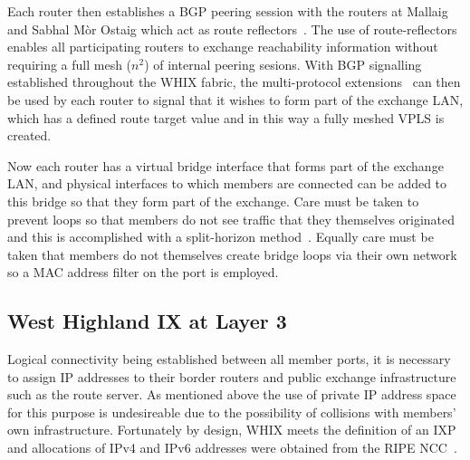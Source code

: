 Each router then establishes a \ac{BGP} peering session with the
routers at Mallaig and Sabhal M\`{o}r Ostaig which act as route
reflectors~\cite{rfc4456}. The use of route-reflectors enables all
participating routers to exchange reachability information without
requiring a full mesh ($n^2$) of internal peering
sesions. With \ac{BGP} signalling established throughout the \ac{WHIX}
fabric,  the multi-protocol extensions~\cite{rfc4760} can then be used
by each router to signal that it wishes to form part of the
exchange \ac{LAN}, which has a defined route target value and in this
way a fully meshed \ac{VPLS} is created.

Now each router has a virtual bridge interface that forms part of the
exchange \ac{LAN}, and physical interfaces to which members are
connected can be added to this bridge so that they form part of the
exchange. Care must be taken to prevent loops so that members do not
see traffic that they themselves originated and this is accomplished
with a split-horizon method~\cite{rfc4762}. Equally care must be taken
that members do not themselves create bridge loops via their own
network so a \ac{MAC} address filter on the port is employed.

\subsection{West Highland IX at Layer 3}

Logical connectivity being established between all member ports, it is
necessary to assign IP addresses to their border routers and public
exchange infrastructure such as the route server. As mentioned above
the use of private IP address space for this purpose is undesireable
due to the possibility of collisions with members' own
infrastructure. Fortunately by design, \ac{WHIX} meets the definition
of an \ac{IXP}~\cite{ripe451,whixrules} and allocations of IPv4 and
IPv6 addresses were obtained from the RIPE NCC~\cite{ripe649}.

